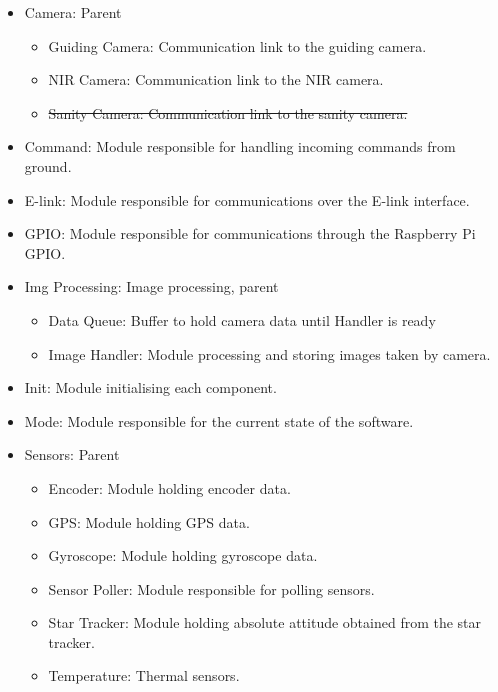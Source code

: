 \begin{itemize}

    \item Camera: Parent
        \begin{itemize}
            \item Guiding Camera: Communication link to the guiding camera.
            \item NIR Camera: Communication link to the NIR camera.
            \item \st{Sanity Camera: Communication link to the sanity camera.}
        \end{itemize}

    \item Command: Module responsible for handling incoming commands from ground.

    \item E-link: Module responsible for communications over the E-link interface.

    \item GPIO: Module responsible for communications through the Raspberry Pi GPIO.

    \item Img Processing: Image processing, parent
        \begin{itemize}
            \item Data Queue: Buffer to hold camera data until Handler is ready
            \item Image Handler: Module processing and storing images taken by camera.
        \end{itemize}

    \item Init: Module initialising each component.

    \item Mode: Module responsible for the current state of the software.

    \item Sensors: Parent
        \begin{itemize}
            \item Encoder: Module holding encoder data.
            \item GPS: Module holding GPS data.
            \item Gyroscope: Module holding gyroscope data.
             \item Sensor Poller: Module responsible for polling sensors.
            \item Star Tracker: Module holding absolute attitude obtained from the star tracker.
            \item Temperature: Thermal sensors.
        \end{itemize}


\end{itemize}
